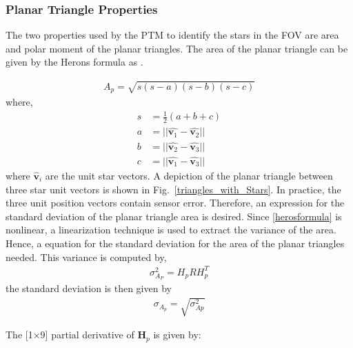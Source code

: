\documentclass[]{aiaa-tc}%
\begin{document}
\subsubsection{Planar Triangle Properties}

The two properties used by the PTM to identify the stars in the FOV are area and polar moment of the planar triangles. The area of the planar triangle can be given by the Herons formula as \cite{cole_fast_2006}.

\begin{align}
\label{herosformula}
A_p = \sqrt{s(s-a)(s-b)(s-c)}
\end{align}
where, 
\vspace{-1 cm}
\begin{subequations}
\begin{align}
s &= \frac{1}{2}(a+b+c)\\
a &= ||\hat{\textbf{v}_1} - \hat{\textbf{v}_2}||\\
b &= ||\hat{\textbf{v}_2} - \hat{\textbf{v}_3}||\\
c &= ||\hat{\textbf{v}_1} - \hat{\textbf{v}_3}||
\end{align}
\end{subequations}
where $\hat{\textbf{v}}_i$ are the unit star vectors. A depiction of the planar triangle between three star unit vectors is shown in Fig.~\ref{triangles_with_Stars}. In practice,
the three unit position vectors contain sensor error. Therefore, an expression for the standard
deviation of the planar triangle area is desired. Since \cref{herosformula} is nonlinear, a linearization
technique is used to extract the variance of the area. Hence, a equation for the standard deviation for the area of the planar triangles needed. This variance is computed by,
\begin{align}
\sigma^2_{A_{P}} = H_p R H^{T}_p \label{area_covar}
\end{align}
the standard deviation is then given by
\begin{align}
\sigma_{A_{p}} = \sqrt{\sigma^2_{A{p}}} \label{area_STD}
\end{align}

The [1$\times$9] partial derivative of $\textbf{H}_p$ is given by:
\end{document}
